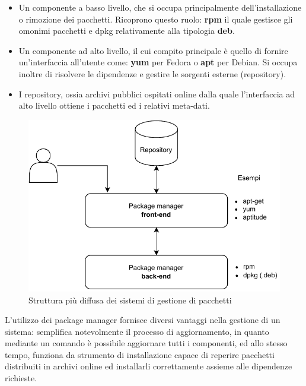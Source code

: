 \begin{itemize}
	\item Un componente a basso livello, che si occupa principalmente dell'installazione o rimozione dei pacchetti. Ricoprono questo ruolo: \textbf{rpm} il quale gestisce gli omonimi pacchetti e dpkg relativamente alla tipologia \textbf{deb}.
	\item Un componente ad alto livello, il cui compito principale è quello di fornire un'interfaccia all'utente come: \textbf{yum} per Fedora o \textbf{apt} per Debian. Si occupa inoltre di risolvere le dipendenze e gestire le sorgenti esterne (repository).
	\item I repository, ossia archivi pubblici ospitati online dalla quale l'interfaccia ad alto livello ottiene i pacchetti ed i relativi meta-dati.
\end{itemize}

\begin{figure}[H]
	\centering
	\includegraphics[width=.7\linewidth]{figures/package-managers.pdf}
	\caption{Struttura più diffusa dei sistemi di gestione di pacchetti}
	\label{fig:package-managers}
\end{figure}

L'utilizzo dei package manager fornisce diversi vantaggi nella gestione di un sistema: semplifica notevolmente il processo di aggiornamento, in quanto mediante un comando è possibile aggiornare tutti i componenti, ed allo stesso tempo, funziona da strumento di installazione capace di reperire pacchetti distribuiti in archivi online ed installarli correttamente assieme alle dipendenze richieste. 

